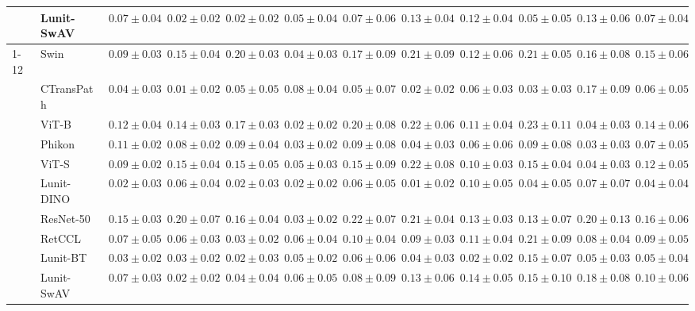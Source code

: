 \begin{tabular}{ll|cccc|c|cccc|c}
 & Lunit-SwAV & $0.07 \pm 0.04$ & $\mathbf{0.02 \pm 0.02}$ & $\mathbf{0.02 \pm 0.02}$ & $0.05 \pm 0.04$ & $0.07 \pm 0.06$ & $0.13 \pm 0.04$ & $0.12 \pm 0.04$ & $0.05 \pm 0.05$ & $0.13 \pm 0.06$ & $0.07 \pm 0.04$ \\
\cline{1-12}
\multirow[t]{10}{*}{Transformer} & Swin & $0.09 \pm 0.03$ & $0.15 \pm 0.04$ & $0.20 \pm 0.03$ & $0.04 \pm 0.03$ & $0.17 \pm 0.09$ & $0.21 \pm 0.09$ & $0.12 \pm 0.06$ & $0.21 \pm 0.05$ & $0.16 \pm 0.08$ & $0.15 \pm 0.06$ \\
 & CTransPath & $0.04 \pm 0.03$ & $\mathbf{0.01 \pm 0.02}$ & $0.05 \pm 0.05$ & $0.08 \pm 0.04$ & $\mathbf{0.05 \pm 0.07}$ & $0.02 \pm 0.02$ & $0.06 \pm 0.03$ & $\mathbf{0.03 \pm 0.03}$ & $0.17 \pm 0.09$ & $0.06 \pm 0.05$ \\
 & ViT-B & $0.12 \pm 0.04$ & $0.14 \pm 0.03$ & $0.17 \pm 0.03$ & $0.02 \pm 0.02$ & $0.20 \pm 0.08$ & $0.22 \pm 0.06$ & $0.11 \pm 0.04$ & $0.23 \pm 0.11$ & $0.04 \pm 0.03$ & $0.14 \pm 0.06$ \\
 & Phikon & $0.11 \pm 0.02$ & $0.08 \pm 0.02$ & $0.09 \pm 0.04$ & $0.03 \pm 0.02$ & $0.09 \pm 0.08$ & $0.04 \pm 0.03$ & $0.06 \pm 0.06$ & $0.09 \pm 0.08$ & $\mathbf{0.03 \pm 0.03}$ & $0.07 \pm 0.05$ \\
 & ViT-S & $0.09 \pm 0.02$ & $0.15 \pm 0.04$ & $0.15 \pm 0.05$ & $0.05 \pm 0.03$ & $0.15 \pm 0.09$ & $0.22 \pm 0.08$ & $0.10 \pm 0.03$ & $0.15 \pm 0.04$ & $0.04 \pm 0.03$ & $0.12 \pm 0.05$ \\
 & Lunit-DINO & $\mathbf{0.02 \pm 0.03}$ & $0.06 \pm 0.04$ & $\mathbf{0.02 \pm 0.03}$ & $\mathbf{0.02 \pm 0.02}$ & $0.06 \pm 0.05$ & $\mathbf{0.01 \pm 0.02}$ & $0.10 \pm 0.05$ & $0.04 \pm 0.05$ & $0.07 \pm 0.07$ & $\mathbf{0.04 \pm 0.04}$ \\
 & ResNet-50 & $0.15 \pm 0.03$ & $0.20 \pm 0.07$ & $0.16 \pm 0.04$ & $0.03 \pm 0.02$ & $0.22 \pm 0.07$ & $0.21 \pm 0.04$ & $0.13 \pm 0.03$ & $0.13 \pm 0.07$ & $0.20 \pm 0.13$ & $0.16 \pm 0.06$ \\
 & RetCCL & $0.07 \pm 0.05$ & $0.06 \pm 0.03$ & $0.03 \pm 0.02$ & $0.06 \pm 0.04$ & $0.10 \pm 0.04$ & $0.09 \pm 0.03$ & $0.11 \pm 0.04$ & $0.21 \pm 0.09$ & $0.08 \pm 0.04$ & $0.09 \pm 0.05$ \\
 & Lunit-BT & $0.03 \pm 0.02$ & $0.03 \pm 0.02$ & $0.02 \pm 0.03$ & $0.05 \pm 0.02$ & $0.06 \pm 0.06$ & $0.04 \pm 0.03$ & $\mathbf{0.02 \pm 0.02}$ & $0.15 \pm 0.07$ & $0.05 \pm 0.03$ & $0.05 \pm 0.04$ \\
 & Lunit-SwAV & $0.07 \pm 0.03$ & $0.02 \pm 0.02$ & $0.04 \pm 0.04$ & $0.06 \pm 0.05$ & $0.08 \pm 0.09$ & $0.13 \pm 0.06$ & $0.14 \pm 0.05$ & $0.15 \pm 0.10$ & $0.18 \pm 0.08$ & $0.10 \pm 0.06$ \\

\end{tabular}
